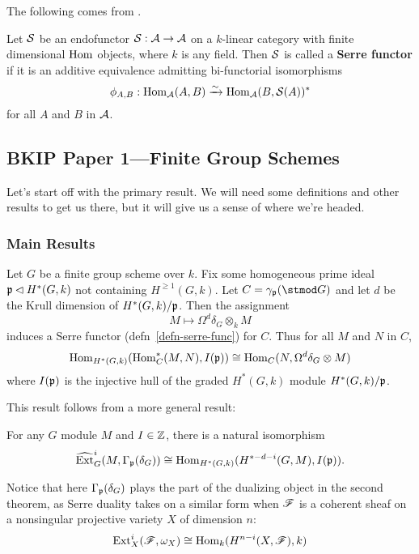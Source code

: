 \documentclass[12pt]{article}
\begin{document}
The following comes from \cite{nlab-serre-functor}. 
\begin{defn}\label{defn-serre-func}
	Let $\mathcal{S}$ be an endofunctor $\mathcal{S}:\mathcal{A}\to\mathcal{A}$ on a $k$-linear category with finite dimensional $\operatorname{Hom}$ objects,
	where $k$ is any field. Then $\mathcal{S}$ is called a \textbf{Serre functor} if it is an additive equivalence admitting 
	bi-functorial isomorphisms
	\[\phi_{A,B}:\operatorname{Hom}_{\mathcal{A}}(A,B)\xrightarrow{\sim}\operatorname{Hom}_{\mathcal{A}}(B,\mathcal{S}(A))^\ast\]
	for all $A$ and $B$ in $\mathcal{A}$.
\end{defn}



\subsection{BKIP Paper 1---Finite Group Schemes}
Let's start off with the primary result. We will need some definitions and other results to get us there, but it will give us a sense of 
where we're headed.
\subsubsection{Main Results}
\begin{thm}[BKIP `18]\label{thm-BKIP18}
	Let $G$ be a finite group scheme over $k$. Fix some homogeneous prime ideal $\mathfrak{p}\lhd H^\ast(G,k)$ not containing $H^{\ge 1}(G,k)$. Let $C=\gamma_\frakp(\stmod G)$
	and let $d$ be the Krull dimension of $H^\ast(G,k)/\mathfrak{p}$. Then the assignment
	\[M\mapsto \Omega^d\delta_G\otimes_k M\]
	induces a Serre functor (defn~\ref{defn-serre-func}) for $C$. Thus for all $M$ and $N$ in $C$,
	\[\operatorname{Hom}_{H^\ast(G,k)}(\operatorname{Hom}_C^\ast(M,N),I(\mathfrak{p}))\cong\operatorname{Hom}_C(N,\Omega^d\delta_G\otimes M)\]
	where $I(\mathfrak{p})$ is the injective hull of the graded $H^\ast(G,k)$ module $H^\ast(G,k)/\mathfrak{p}$.
\end{thm}

\noindent This result follows from a more general result:
\begin{thm}[BKIP `18]\label{thm-BKIP18-ext}
	For any $G$ module $M$ and $I\in\mathbb{Z}$, there is a natural isomorphism
	\[\widehat{\operatorname{Ext}}^i_G(M,\Gamma_{\mathfrak{p}}(\delta_G))\cong\operatorname{Hom}_{H^\ast(G,k)}(H^{\ast-d-i}(G,M),I(\mathfrak{p})).\]
\end{thm}
\begin{rmk}
	Notice that here $\Gamma_{\mathfrak{p}}(\delta_G)$ plays the part of the dualizing object in the second theorem, as Serre duality takes 
	on a similar form when $\mathscr{F}$ is a coherent sheaf on a nonsingular projective variety $X$ of dimension $n$:
	\[\operatorname{Ext}_X^i(\mathscr{F},\omega_X)\cong \operatorname{Hom}_k(H^{n-i}(X,\mathscr{F}),k)\]
\end{rmk}
\end{document}
